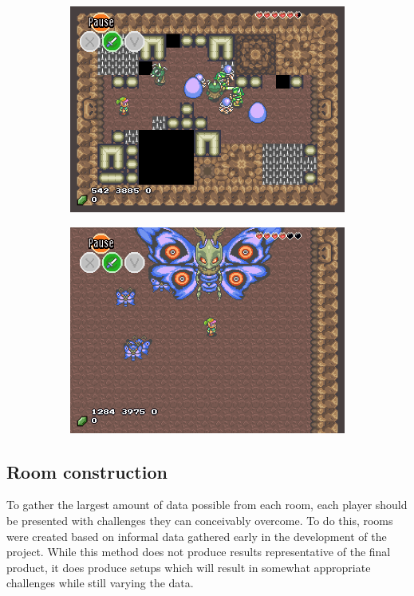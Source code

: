 \documentclass[a4paper]{article}
\begin{document}
\begin{multicols*}{2}
\begin{figure}[t]
\begin{subfigure}[b]{0.45\textwidth}
  \includegraphics[width=\textwidth]{dungeonroom}
\end{subfigure} \hfill
\begin{subfigure}[b]{0.45\textwidth}
  \includegraphics[width=\textwidth]{bossroom}
\end{subfigure} \hfill
\end{figure}

\subsection{Room construction} \label{roomconstruction}
To gather the largest amount of data possible from each room, each player should be presented with challenges they can conceivably overcome. To do this, rooms were created based on informal data gathered early in the development of the project. While this method does not produce results representative of the final product, it does produce setups which will result in somewhat appropriate challenges while still varying the data. 


\end{multicols*}
\end{document}
